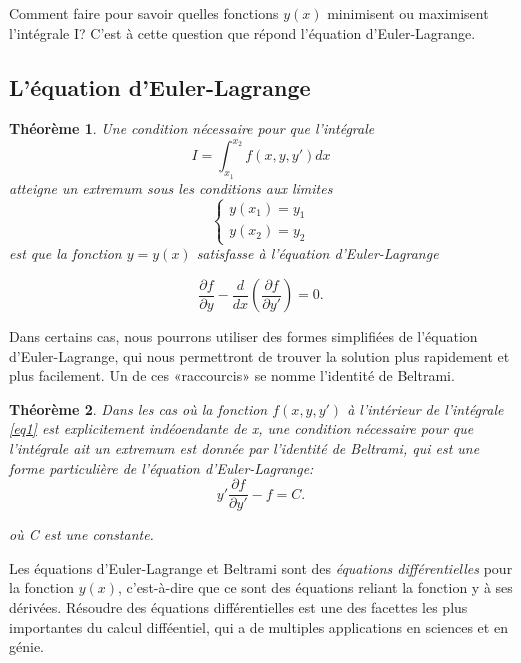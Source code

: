 \documentclass[10pt,a4paper]{article}%
\theoremstyle{theorem}
\newtheorem{theorem}{Théorème}
\theoremstyle{definition}
\begin{document}
	Comment faire pour savoir quelles fonctions $y(x)$ minimisent ou maximisent l'intégrale I? C'est à cette question que répond l'équation d'Euler-Lagrange.
		 
		\subsection{L'équation d'Euler-Lagrange}
			\begin{theorem}
	  			Une condition nécessaire pour que l'intégrale
	  			\begin{equation}\label{eq1}
		   			I=\int_{x_1}^{x_2} f(x,y,y')dx
		   		\end{equation}
		   		atteigne un extremum sous les conditions aux limites 
		   			\begin{equation}\label{eq2}
		   				\begin{cases}
		   					y(x_1)=y_1
		   					\\
		   					y(x_2)=y_2
		   				\end{cases}
		   			\end{equation}
		    	est que la fonction $y=y(x)$ satisfasse à l'équation d'Euler-Lagrange
		    	
		    		
		  			 \begin{equation}\label{eq3}
		  			 	\frac{\partial f}{\partial y}- \frac{d}{dx}(\frac{\partial f}{\partial y'})=0.
		  			 \end{equation}
				\end{theorem}
	
			Dans certains cas, nous pourrons utiliser des formes simplifiées de l'équation d'Euler-Lagrange, qui nous permettront de trouver la solution plus rapidement et plus facilement. Un de ces «raccourcis» se nomme l'identité de Beltrami.	 
			
				\begin{theorem}\label{thm2}
					 Dans les cas où la fonction $f(x,y,y')$ à l'intérieur de l'intégrale \eqref{eq1} est explicitement indéoendante de x, une condition nécessaire pour que l'intégrale ait un extremum est donnée par l'identité de Beltrami, qui est une forme particulière de l'équation d'Euler-Lagrange: 
					 \begin{equation}
					 	y'\frac{\partial f}{\partial y'}-f=C.
					 \end{equation}
					 
					 où C est une constante.
				\end{theorem}
			
			Les équations d'Euler-Lagrange et Beltrami sont des \textit{équations différentielles} pour la fonction $y(x)$, c'est-à-dire que ce sont des équations reliant la fonction y à ses dérivées. Résoudre des équations différentielles est une des facettes les plus importantes du calcul difféentiel, qui a de multiples applications en sciences et en génie.
			
\end{document}
